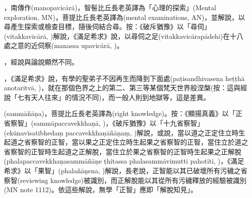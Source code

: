 \startitemgroup[noteitems]
\item{}，南傳作(manopavicārā)，智髻比丘長老英譯為「心理的探索」(Mental exploration, MN)，菩提比丘長老英譯為(mental examinations, AN)，並解說，以尋產生探索或檢查目標，隨後伺結合尋。按：《破斥猶豫》以「尋伺」(vitakkavicārā, )解說，《滿足希求》說，以尋伺之足(vitakkavicārapādehi)在十八處之意的近伺察(manassa upavicārā, )。
\stopitemgroup

\startitemgroup[noteitems]
\item{}，經說與論說顯然不同。
\item{}，《滿足希求》說，有學的聖弟子不因再生而降到下面處(paṭisandhivasena heṭṭhā anotaritvā, )，就在那個色界之上的第二、第三等某個梵天世界般涅槃(按：這與經說「七有天人往來」的情況不同)，而一般人則到地獄等，這是差異。
\stopitemgroup

\startitemgroup[noteitems]
\item{}(sammāñāṇa)，菩提比丘長老英譯為(right knowledge)。按：《顯揚真義》以「正省察智」(sammāpaccavekkhaṇā, )，《破斥猶豫》以「十九省察智」(ekūnavīsatibhedaṃ paccavekkhaṇāñāṇaṃ, )解說，或說，當以道之正定住立時生起道之省察智的正智，當以果之正定住立時生起果之省察智的正智，當住立於道之省察智的正智時生起道之正解脫，當住立於果之省察智的正智時生起果之正解脫(phalapaccavekkhaṇasammāñāṇe ṭhitassa phalasammāvimutti pahotīti, )，《滿足希求》以「果智」(phalañāṇena, )解說，長老說，正智能以其已破壞所有污穢之省察智(reviewing knowledge)被識別，而正解脫能以其從所有污穢釋放的經驗被識別(MN note 1112)。依這些解說，無學「正智」應即「解脫知見」。
\stopitemgroup

